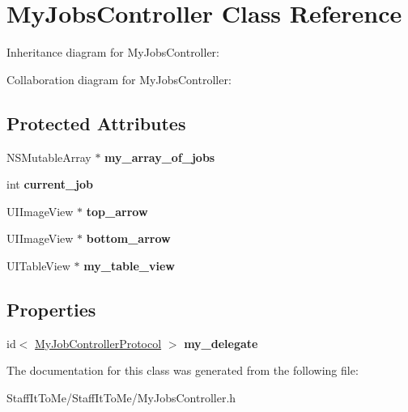 \hypertarget{interface_my_jobs_controller}{
\section{\-My\-Jobs\-Controller \-Class \-Reference}
\label{interface_my_jobs_controller}
}


\-Inheritance diagram for \-My\-Jobs\-Controller\-:


\-Collaboration diagram for \-My\-Jobs\-Controller\-:
\subsection*{\-Protected \-Attributes}
\begin{DoxyCompactItemize}
\item 
\hypertarget{interface_my_jobs_controller_a3d2abf963f679a09d80f64862b4c5ae9}{
\-N\-S\-Mutable\-Array $\ast$ {\bfseries my\-\_\-array\-\_\-of\-\_\-jobs}}
\label{interface_my_jobs_controller_a3d2abf963f679a09d80f64862b4c5ae9}

\item 
\hypertarget{interface_my_jobs_controller_ab0a0770e6d3bb8b5ec3571340500673c}{
int {\bfseries current\-\_\-job}}
\label{interface_my_jobs_controller_ab0a0770e6d3bb8b5ec3571340500673c}

\item 
\hypertarget{interface_my_jobs_controller_a166a15f52d4c68ceb570e5537a72ac25}{
\-U\-I\-Image\-View $\ast$ {\bfseries top\-\_\-arrow}}
\label{interface_my_jobs_controller_a166a15f52d4c68ceb570e5537a72ac25}

\item 
\hypertarget{interface_my_jobs_controller_ab164fc504008cb2f8090f6067101dd9a}{
\-U\-I\-Image\-View $\ast$ {\bfseries bottom\-\_\-arrow}}
\label{interface_my_jobs_controller_ab164fc504008cb2f8090f6067101dd9a}

\item 
\hypertarget{interface_my_jobs_controller_a13caffb81c42b3402d24b9836521e6e5}{
\-U\-I\-Table\-View $\ast$ {\bfseries my\-\_\-table\-\_\-view}}
\label{interface_my_jobs_controller_a13caffb81c42b3402d24b9836521e6e5}

\end{DoxyCompactItemize}
\subsection*{\-Properties}
\begin{DoxyCompactItemize}
\item 
\hypertarget{interface_my_jobs_controller_ac1de97636a9dd90b3841ecb8d6b7baa0}{
id$<$ \hyperlink{protocol_my_job_controller_protocol-p}{\-My\-Job\-Controller\-Protocol} $>$ {\bfseries my\-\_\-delegate}}
\label{interface_my_jobs_controller_ac1de97636a9dd90b3841ecb8d6b7baa0}

\end{DoxyCompactItemize}


\-The documentation for this class was generated from the following file\-:\begin{DoxyCompactItemize}
\item 
\-Staff\-It\-To\-Me/\-Staff\-It\-To\-Me/\-My\-Jobs\-Controller.\-h\end{DoxyCompactItemize}
